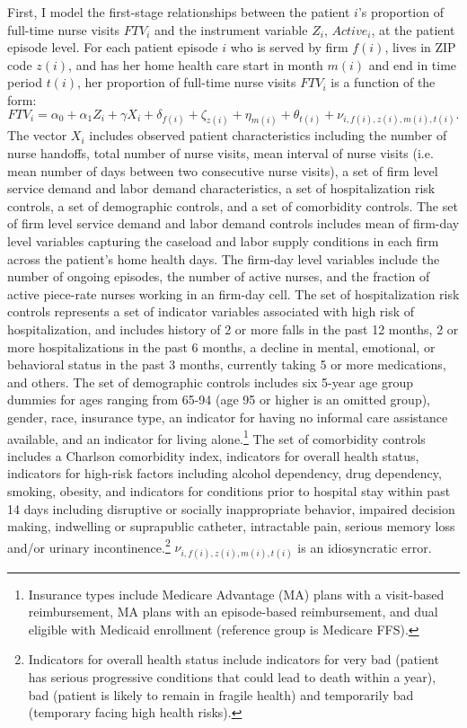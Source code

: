 \documentclass[final,12pt]{article}
\begin{document}
First, I model the first-stage relationships between the patient $i$'s proportion of full-time nurse visits $FTV_i$ and the instrument variable $Z_i$, $Active_{i}$, at the patient episode level. For each patient episode $i$ who is served by firm $f(i)$, lives in ZIP code $z(i)$, and has her home health care start in month $m(i)$ and end in time period $t(i)$, her proportion of full-time nurse visits $FTV_i$ is a function of the form:
\begin{equation} \label{eq:iv1s}
FTV_i =  \alpha_0 + \alpha_1 Z_i + \gamma X_i + \delta_{f(i)} + \zeta_{z(i)} +  \eta_{m(i)} + \theta_{t(i)} + \nu_{i, f(i), z(i), m(i), t(i)}.
\end{equation}
The vector $X_i$ includes observed patient characteristics including the number of nurse handoffs, total number of nurse visits, mean interval of nurse visits (i.e. mean number of days between two consecutive nurse visits), a set of firm level service demand and labor demand characteristics, a set of hospitalization risk controls, a set of demographic controls, and a set of comorbidity controls.
The set of firm level service demand and labor demand controls includes mean of firm-day level variables capturing the caseload and labor supply conditions in each firm across the patient's home health days. The firm-day level variables include the number of ongoing episodes, the number of active nurses, and the fraction of active piece-rate nurses working in an firm-day cell.
The set of hospitalization risk controls represents a set of indicator variables associated with high risk of hospitalization, and includes history of 2 or more falls in the past 12 months, 2 or more hospitalizations in the past 6 months, a decline in mental, emotional, or behavioral status in the past 3 months, currently taking 5 or more medications, and others.
The set of demographic controls includes six 5-year age group dummies for ages ranging from 65-94 (age 95 or higher is an omitted group), gender, race, insurance type, an indicator for having no informal care assistance available, and an indicator for living alone.\footnote{Insurance types include Medicare Advantage (MA) plans with a visit-based reimbursement, MA plans with an episode-based reimbursement, and dual eligible with Medicaid enrollment (reference group is Medicare FFS).
}
The set of comorbidity controls includes a Charlson comorbidity index, indicators for overall health status, indicators for high-risk factors including alcohol dependency, drug dependency, smoking, obesity, and indicators for conditions prior to hospital stay within past 14 days including disruptive or socially inappropriate behavior, impaired decision making, indwelling or suprapublic catheter, intractable pain, serious memory loss and/or urinary incontinence.\footnote{Indicators for overall health status include indicators for very bad (patient has serious progressive conditions that could lead to death within a year), bad (patient is likely to remain in fragile health) and temporarily bad (temporary facing high health risks).
}
$\nu_{i, f(i), z(i), m(i), t(i)}$ is an idiosyncratic error.
\end{document}
